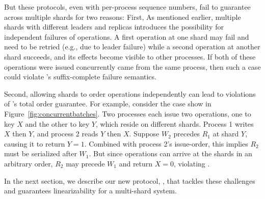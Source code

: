 But these protocols, even with per-process sequence numbers, fail to 
guarantee \MDL{} across multiple shards for two reasons: First,
As mentioned earlier, multiple shards with different leaders and replicas
introduces the possibility for independent failures of operations. A first
operation at one shard may fail and need to be retried (e.g., due to
leader failure) while a second operation at another shard succeeds, and
its effects become visible to other processes. If both of these
operations were issued concurrently came from the same process, 
then such a case could violate \MDL{}'s suffix-complete failure semantics.

Second, allowing shards to order operations independently can lead to
violations of \MDL{}'s total order guarantee. For example, consider the
case show in Figure~\ref{fig:concurrentbatches}. Two processes each issue two
operations, one to key $X$ and the other to key $Y$, which reside on different
shards. Process 1 writes $X$ then $Y$, and process 2 reads $Y$ then $X$. Suppose $W_2$ precedes $R_1$ at shard $Y$, causing it to return $Y=1$. Combined with
process 2's issue-order, this implies $R_2$ must be serialized after $W_1$.
But since operations can arrive at the shards in an arbitrary order, $R_2$ may
precede $W_1$ and return $X=0$, violating \MDL{}.

In the next section, we describe our new protocol, \sys{}, that tackles these
challenges and guarantees \multidispatch{} linearizability for a multi-shard
system.
